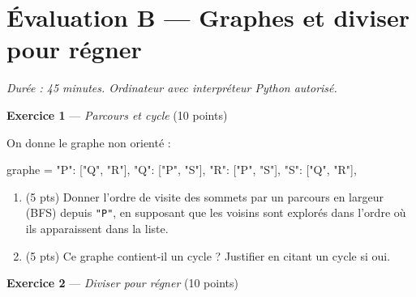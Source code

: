 \section*{Évaluation B --- Graphes et diviser pour régner}
\textit{Durée : 45 minutes. Ordinateur avec interpréteur Python autorisé.}


\bigskip

\textbf{Exercice 1} --- \textit{Parcours et cycle} \hfill (10 points)

On donne le graphe non orienté :
\begin{python}
graphe = {
    "P": ["Q", "R"],
    "Q": ["P", "S"],
    "R": ["P", "S"],
    "S": ["Q", "R"],
}
\end{python}
\begin{enumerate}
  \item (5 pts) Donner l'ordre de visite des sommets par un parcours en largeur (BFS) depuis \texttt{"P"}, en supposant que les voisins sont explorés dans l'ordre où ils apparaissent dans la liste.
  \item (5 pts) Ce graphe contient-il un cycle ? Justifier en citant un cycle si oui.
\end{enumerate}


\bigskip

\textbf{Exercice 2} --- \textit{Diviser pour régner} \hfill (10 points)

